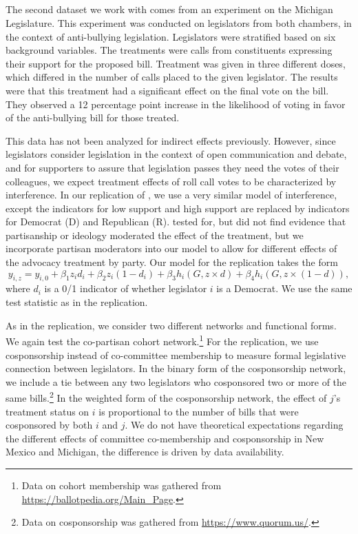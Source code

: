 \documentclass[12pt]{article}
\begin{document}
\subsection{\citet{bergan2015call}}


The second dataset we work with comes from an experiment on the Michigan Legislature. This experiment was conducted on legislators from both chambers, in the context of anti-bullying legislation. Legislators were stratified based on six background variables. The treatments were calls from constituents expressing their support for the proposed bill. Treatment was given in three different doses, which differed in the number of calls placed to the given legislator. The results were that this treatment had a significant effect on the final vote on the bill. They observed a 12 percentage point increase in the likelihood of voting in favor of the anti-bullying bill for those treated. 

This data has not been analyzed for indirect effects previously. However, since legislators consider legislation in the context of open communication and debate, and for supporters to assure that legislation passes they need the votes of their colleagues, we expect treatment effects of roll call votes to be characterized by interference. In our replication of  \citet{bergan2015call}, we use a very similar model of interference, except the indicators for low support and high support are replaced by indicators for Democrat (D) and Republican (R).   \citet{bergan2015call} tested for, but did not find evidence that partisanship or ideology moderated the effect of the treatment, but we incorporate partisan moderators into our model to allow for different effects of the advocacy treatment by party. Our model for the 
\citet{bergan2015call} replication takes the form $$y_{i,z} = y_{i,0}+\beta_1z_id_i+\beta_2z_i(1-d_i)+\beta_3h_i(G,z\times d)+\beta_4h_i(G,z\times (1-d)),$$  where $d_i$ is a 0/1 indicator of whether legislator $i$ is a Democrat. We use the same test statistic as in the \citet{butler2011can} replication.

As in the \citet{butler2011can} replication, we consider two different networks and functional forms. We again test the co-partisan cohort network.\footnote{Data on cohort membership was gathered from \url{https://ballotpedia.org/Main_Page}.} For the \citet{bergan2015call} replication, we use cosponsorship instead of co-committee membership to measure formal legislative connection between legislators. In the binary form of the cosponsorship network, we include a tie between any two legislators who cosponsored two or more of the same bills.\footnote{Data on cosponsorship was gathered from \url{https://www.quorum.us/}.} In the weighted form of the cosponsorship network, the effect of $j$'s treatment status on $i$ is proportional to the number of bills that were cosponsored by both $i$ and $j$. We do not have theoretical expectations regarding the different effects of committee co-membership and cosponsorship in New Mexico and Michigan, the difference is driven by data availability. 
\end{document}
